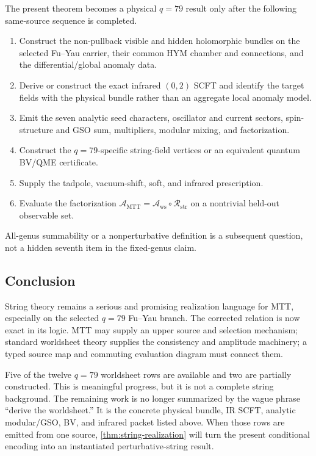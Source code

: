 \documentclass[11pt]{article}
\theoremstyle{definition}
\theoremstyle{remark}
\newcommand{\cA}{\mathcal A}
\newcommand{\cR}{\mathcal R}
\begin{document}
The present theorem becomes a physical \(q=79\) result only after the
following same-source sequence is completed.
\begin{enumerate}[leftmargin=1.7em]
\item Construct the non-pullback visible and hidden holomorphic bundles on
      the selected Fu--Yau carrier, their common HYM chamber and connections,
      and the differential/global anomaly data.
\item Derive or construct the exact infrared \((0,2)\) SCFT and identify the
      target fields with the physical bundle rather than an aggregate local
      anomaly model.
\item Emit the seven analytic seed characters, oscillator and current
      sectors, spin-structure and GSO sum, multipliers, modular mixing, and
      factorization.
\item Construct the \(q=79\)-specific string-field vertices or an equivalent
      quantum BV/QME certificate.
\item Supply the tadpole, vacuum-shift, soft, and infrared prescription.
\item Evaluate the factorization
      \(\cA_{\mathrm{MTT}}=\cA_{\mathrm{ws}}\circ\cR_{\mathrm{str}}\) on a
      nontrivial held-out observable set.
\end{enumerate}
All-genus summability or a nonperturbative definition is a subsequent
question, not a hidden seventh item in the fixed-genus claim.

\subsection{Conclusion}

String theory remains a serious and promising realization language for MTT,
especially on the selected \(q=79\) Fu--Yau branch.  The corrected relation is
now exact in its logic.  MTT may supply an upper source and selection
mechanism; standard worldsheet theory supplies the consistency and amplitude
machinery; a typed source map and commuting evaluation diagram must connect
them.

Five of the twelve \(q=79\) worldsheet rows are available and two are
partially constructed.  This is meaningful progress, but it is not a
complete string background.  The remaining work is no longer summarized by
the vague phrase ``derive the worldsheet.''  It is the concrete physical
bundle, IR SCFT, analytic modular/GSO, BV, and infrared packet listed above.
When those rows are emitted from one source, \cref{thm:string-realization}
will turn the present conditional encoding into an instantiated
perturbative-string result.
\end{document}
